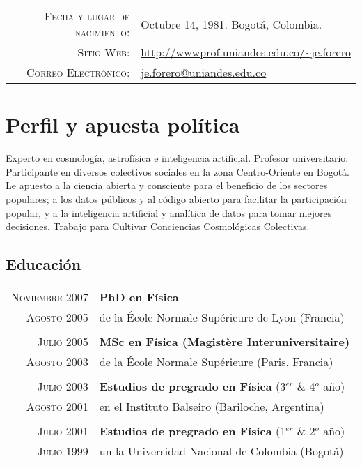 \documentclass[a4paper,10pt]{article} %
\begin{document}
\pagestyle{empty} %




\par{ \bigskip\par} %


\begin{tabular}{rl}
\textsc{Fecha y lugar de nacimiento:} & Octubre 14, 1981. Bogotá, Colombia.\\
\textsc{Sitio Web:} & \url{http://wwwprof.uniandes.edu.co/~je.forero}\\
\textsc{Correo Electrónico:} & \href{mailto:je.forero@uniandes.edu.co}{je.forero@uniandes.edu.co}\\
\end{tabular}


\color{red}
\section{Perfil y apuesta política}
\color{black}

Experto en cosmolog\'ia, astrof\'isica e inteligencia artificial. 
Profesor universitario. Participante en diversos colectivos sociales en la  zona Centro-Oriente en Bogotá.
Le apuesto a la ciencia  abierta y consciente para el beneficio de los sectores populares;
a los datos públicos y al código abierto para facilitar la participación popular, y a la
inteligencia artificial y analítica de datos para tomar mejores decisiones.
Trabajo para Cultivar Conciencias Cosmológicas Colectivas.
\color{red}
\subsection{Educación}
\color{black}


\begin{tabular}{rl}	
\textsc{Noviembre 2007} & {\bf PhD en Física}\\
\textsc{Agosto 2005}& de la \'Ecole Normale Sup\'erieure de Lyon (Francia) \\
&\\
\textsc{Julio 2005} & {\bf MSc en Física (Magist\`ere Interuniversitaire)}\\  
\textsc{Agosto 2003}& de la \'Ecole Normale Sup\'erieure (Paris, Francia) \\
&\\
\textsc{Julio 2003} & {\bf Estudios de pregrado en Física} (3$^{er}$ \& 4$^{o}$ año)\\
\textsc{Agosto 2001} & en el Instituto Balseiro (Bariloche, Argentina)\\
&\\
\textsc{Julio 2001}  & {\bf Estudios de pregrado en Física} (1$^{er}$ \& 2$^{o}$ año)\\
\textsc{Julio 1999}& un la Universidad Nacional de Colombia (Bogotá)\\
\end{tabular}
\end{document}
